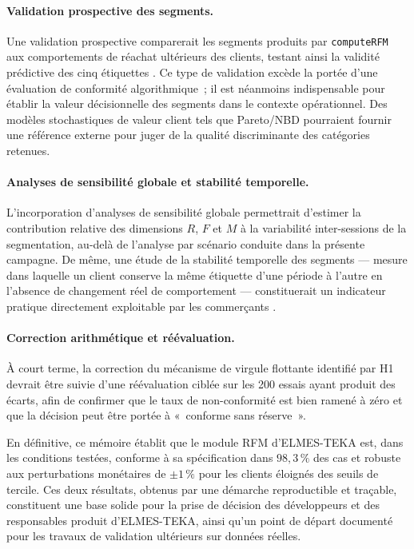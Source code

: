 \paragraph{Validation prospective des segments.}
Une validation prospective comparerait les segments produits par \texttt{computeRFM} aux
comportements de réachat ultérieurs des clients, testant ainsi la validité prédictive des
cinq étiquettes \citep{Fader2005}. Ce type de validation excède la portée d'une évaluation
de conformité algorithmique~; il est néanmoins indispensable pour établir la valeur
décisionnelle des segments dans le contexte opérationnel. Des modèles stochastiques de
valeur client tels que Pareto/NBD \citep{Fader2005} pourraient fournir une référence externe
pour juger de la qualité discriminante des catégories retenues.

\paragraph{Analyses de sensibilité globale et stabilité temporelle.}
L'incorporation d'analyses de sensibilité globale \citep{Lakens2013} permettrait d'estimer
la contribution relative des dimensions $R$, $F$ et $M$ à la variabilité inter-sessions de
la segmentation, au-delà de l'analyse par scénario conduite dans la présente campagne. De
même, une étude de la stabilité temporelle des segments — mesure dans laquelle un client
conserve la même étiquette d'une période à l'autre en l'absence de changement réel de
comportement — constituerait un indicateur pratique directement exploitable par les
commerçants \citep{Mingmongkhol2023}.

\paragraph{Correction arithmétique et réévaluation.}
À court terme, la correction du mécanisme de virgule flottante identifié par H1 devrait
être suivie d'une réévaluation ciblée sur les 200 essais ayant produit des écarts, afin de
confirmer que le taux de non-conformité est bien ramené à zéro et que la décision peut être
portée à «~conforme sans réserve~».

\bigskip

En définitive, ce mémoire établit que le module RFM d'ELMES-TEKA est, dans les conditions
testées, conforme à sa spécification dans $98{,}3\,\%$ des cas et robuste aux perturbations
monétaires de $\pm1\,\%$ pour les clients éloignés des seuils de tercile. Ces deux résultats,
obtenus par une démarche reproductible et traçable, constituent une base solide pour la
prise de décision des développeurs et des responsables produit d'ELMES-TEKA, ainsi qu'un
point de départ documenté pour les travaux de validation ultérieurs sur données réelles.
